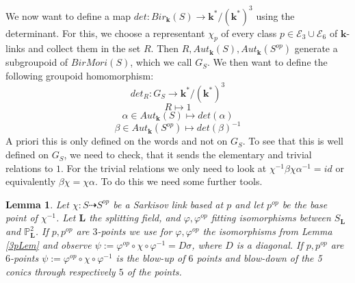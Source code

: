 \documentclass[12pt, oneside, reqno]{amsart}
\newtheorem{lemma}[theorem]{Lemma}
\begin{document}
\noindent 
We now want to define a map $det: Bir_{\textbf{k}}(S) \rightarrow \textbf{k}^* / (\textbf{k}^*)^3$ using the determinant. For this, we choose a representant $\chi_p$ of every class $p \in \mathcal{E}_3 \cup \mathcal{E}_6$ of $\textbf{k}$-links and collect them in the set $R$. Then $R,Aut_{\textbf{k}}(S),Aut_{\textbf{k}}(S^{op})$ generate a subgroupoid of $BirMori(S)$, which we call $G_S$. We then want to define the following groupoid homomorphism: \[det_R: G_S \rightarrow \textbf{k}^*/(\textbf{k}^*)^3\] \[R \mapsto 1\] \[\alpha \in Aut_{\textbf{k}}(S) \mapsto det(\alpha)\] \[\beta \in Aut_{\textbf{k}}(S^{op}) \mapsto det(\beta)^{-1}\] A priori this is only defined on the words and not on $G_S$. To see that this is well defined on $G_S$, we need to check, that it sends the elementary and trivial relations to $1$. For the trivial relations we only need to look at $\chi^{-1} \beta \chi \alpha^{-1} = id$ or equivalently $\beta \chi = \chi \alpha$. To do this we need some further tools. 
\begin{lemma} \label{BaseP}
    Let $\chi: S \dashrightarrow S^{op}$ be a Sarkisov link based at $p$ and let $p^{op}$ be the base point of $\chi^{-1}$. Let $\textbf{L}$ the splitting field, and $\varphi, \varphi^{op}$ fitting isomorphisms between $S_{\textbf{L}}$ and $\mathbb{P}^2_\textbf{L}$. If $p,p^{op}$ are $3$-points we use for $\varphi, \varphi^{op}$ the isomorphisms from Lemma \ref{3pLem} and observe $\psi := \varphi^{op} \circ \chi \circ \varphi^{-1} = D\sigma$, where $D$ is a diagonal. If $p,p^{op}$ are $6$-points $\psi := \varphi^{op} \circ \chi \circ \varphi^{-1}$ is the blow-up of $6$ points and blow-down of the 5 conics through respectively $5$ of the points.
\end{lemma}
\end{document}
